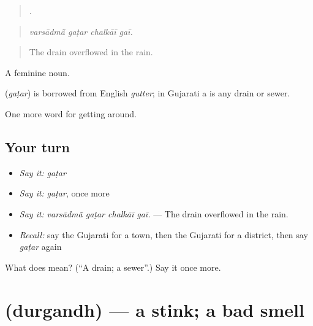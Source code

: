 \begin{quote}
   .
\end{quote}

\begin{quote}
\emph{varsādmā̃ gaṭar chalkāī gaī.}
\end{quote}

\begin{quote}
The drain overflowed in the rain.
\end{quote}

A feminine noun.

\begin{cousinweb}
\textbf{} (\emph{gaṭar}) is borrowed from English \emph{gutter}; in Gujarati a  is any drain or sewer.
\end{cousinweb}

\begin{grammarlens}[title={What you've built}]
One more word for getting around.
\end{grammarlens}

\subsection*{Your turn}
\begin{itemize}
\raggedright
  \item \emph{Say it:} \emph{gaṭar}
  \item \emph{Say it:} \emph{gaṭar}, once more
  \item \emph{Say it:} \emph{varsādmā̃ gaṭar chalkāī gaī.} — The drain overflowed in the rain.
  \item \emph{Recall:} say the Gujarati for a town, then the Gujarati for a district, then say \emph{gaṭar} again
\end{itemize}

\begin{tcolorbox}[breakable,colback=teal!4,colframe=teal!35!black,title={Before you move on}]
What does  mean? (\textquotedblleft{}A drain; a sewer\textquotedblright{}.) Say it once more.
\end{tcolorbox}
\section[\texorpdfstring{\gu{દુર્ગંધ} (durgandh)}{દુર્ગંધ (durgandh)}]{ (durgandh) — a stink; a bad smell}

\label{lesson:GU-C423-durgandh}



